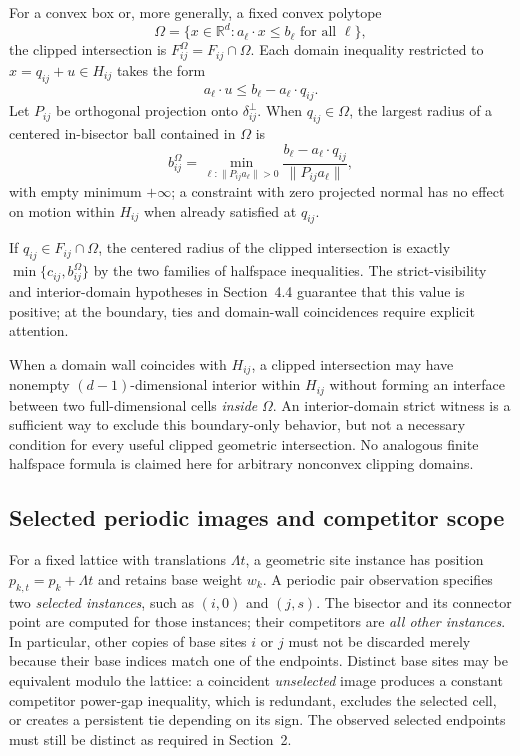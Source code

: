 For a convex box or, more generally, a fixed convex polytope
\begin{equation}
\Omega=\{x\in\mathbb R^d:a_\ell\cdot x\le b_\ell
\text{ for all }\ell\},
\label{eq:domain-halfspaces}
\end{equation}
the clipped intersection is $F_{ij}^{\Omega}=F_{ij}\cap\Omega$. Each domain inequality restricted to $x=q_{ij}+u\in H_{ij}$ takes the form
\begin{equation}
a_\ell\cdot u\le b_\ell-a_\ell\cdot q_{ij}.
\end{equation}
Let $P_{ij}$ be orthogonal projection onto $\delta_{ij}^{\perp}$. When $q_{ij}\in\Omega$, the largest radius of a centered in-bisector ball contained in $\Omega$ is
\begin{equation}
b_{ij}^{\Omega}=
\min_{\ell:\|P_{ij}a_\ell\|>0}
\frac{b_\ell-a_\ell\cdot q_{ij}}{\|P_{ij}a_\ell\|},
\label{eq:box-inplane-radius}
\end{equation}
with empty minimum $+\infty$; a constraint with zero projected normal has no effect on motion within $H_{ij}$ when already satisfied at $q_{ij}$.

If $q_{ij}\in F_{ij}\cap\Omega$, the centered radius of the clipped intersection is exactly $\min\{c_{ij},b_{ij}^{\Omega}\}$ by the two families of halfspace inequalities. The strict-visibility and interior-domain hypotheses in Section~4.4 guarantee that this value is positive; at the boundary, ties and domain-wall coincidences require explicit attention.

When a domain wall coincides with $H_{ij}$, a clipped intersection may have nonempty $(d-1)$-dimensional interior within $H_{ij}$ without forming an interface between two full-dimensional cells \emph{inside} $\Omega$. An interior-domain strict witness is a sufficient way to exclude this boundary-only behavior, but not a necessary condition for every useful clipped geometric intersection. No analogous finite halfspace formula is claimed here for arbitrary nonconvex clipping domains.

\subsection{Selected periodic images and competitor scope}
\label{app:geometry-periodic}

For a fixed lattice with translations $\Lambda t$, a geometric site instance has position $p_{k,t}=p_k+\Lambda t$ and retains base weight $w_k$. A periodic pair observation specifies two \emph{selected instances}, such as $(i,0)$ and $(j,s)$. The bisector and its connector point are computed for those instances; their competitors are \emph{all other instances}. In particular, other copies of base sites $i$ or $j$ must not be discarded merely because their base indices match one of the endpoints. Distinct base sites may be equivalent modulo the lattice: a coincident \emph{unselected} image produces a constant competitor power-gap inequality, which is redundant, excludes the selected cell, or creates a persistent tie depending on its sign. The observed selected endpoints must still be distinct as required in Section~2.

